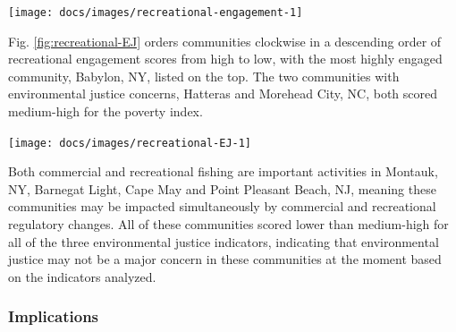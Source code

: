 \documentclass[
  10pt,
]{article}
\let\origfigure\figure
\let\endorigfigure\endfigure
\renewenvironment{figure}[1][2] {
    \expandafter\origfigure\expandafter[H]
} {
    \endorigfigure
}
\begin{document}
\begin{figure}

{\centering \texttt{[image: docs/images/recreational-engagement-1]} 

}

\caption{Recreational engagement and reliance, and environmental justice vulnerability, for the top recreationally engaged and reliant fishing communities in the Mid-Atlantic. Communities ranked medium-high or above for one or more of the environmental justice indicators are highlighted in bright orange. *Community scored high (1.00 and above) for both commercial engagement and reliance indicators.}\label{fig:recreational-engagement}
\end{figure}

Fig. \ref{fig:recreational-EJ} orders communities clockwise in a
descending order of recreational engagement scores from high to low,
with the most highly engaged community, Babylon, NY, listed on the top.
The two communities with environmental justice concerns, Hatteras and
Morehead City, NC, both scored medium-high for the poverty index.

\begin{figure}

{\centering \texttt{[image: docs/images/recreational-EJ-1]} 

}

\caption{Environmental justice indicators (Poverty Index, population composition index, and personal disruption index) for top recreational fishing communities in Mid-Atlantic. *Community scored high (1.00 and above) for both commercial engagement and reliance indicators.}\label{fig:recreational-EJ}
\end{figure}

Both commercial and recreational fishing are important activities in
Montauk, NY, Barnegat Light, Cape May and Point Pleasant Beach, NJ,
meaning these communities may be impacted simultaneously by commercial
and recreational regulatory changes. All of these communities scored
lower than medium-high for all of the three environmental justice
indicators, indicating that environmental justice may not be a major
concern in these communities at the moment based on the indicators
analyzed.

\hypertarget{implications-4}{%
\subsubsection{Implications}\label{implications-4}}
\end{document}
